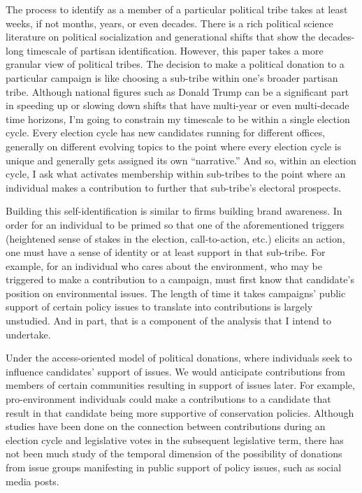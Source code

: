 \documentclass[12pt,]{article}
\begin{document}
The process to identify as a member of a particular political tribe
takes at least weeks, if not months, years, or even decades. There is a
rich political science literature on political socialization and
generational shifts that show the decades-long timescale of partisan
identification. However, this paper takes a more granular view of
political tribes. The decision to make a political donation to a
particular campaign is like choosing a sub-tribe within one's broader
partisan tribe. Although national figures such as Donald Trump can be a
significant part in speeding up or slowing down shifts that have
multi-year or even multi-decade time horizons, I'm going to constrain my
timescale to be within a single election cycle. Every election cycle has
new candidates running for different offices, generally on different
evolving topics to the point where every election cycle is unique and
generally gets assigned its own ``narrative.'' And so, within an
election cycle, I ask what activates membership within sub-tribes to the
point where an individual makes a contribution to further that
sub-tribe's electoral prospects.

Building this self-identification is similar to firms building brand
awareness. In order for an individual to be primed so that one of the
aforementioned triggers (heightened sense of stakes in the election,
call-to-action, etc.) elicits an action, one must have a sense of
identity or at least support in that sub-tribe. For example, for an
individual who cares about the environment, who may be triggered to make
a contribution to a campaign, must first know that candidate's position
on environmental issues. The length of time it takes campaigns' public
support of certain policy issues to translate into contributions is
largely unstudied. And in part, that is a component of the analysis that
I intend to undertake.

Under the access-oriented model of political donations, where
individuals seek to influence candidates' support of issues. We would
anticipate contributions from members of certain communities resulting
in support of issues later. For example, pro-environment individuals
could make a contributions to a candidate that result in that candidate
being more supportive of conservation policies. Although studies have
been done on the connection between contributions during an election
cycle and legislative votes in the subsequent legislative term, there
has not been much study of the temporal dimension of the possibility of
donations from issue groups manifesting in public support of policy
issues, such as social media posts.
\end{document}
